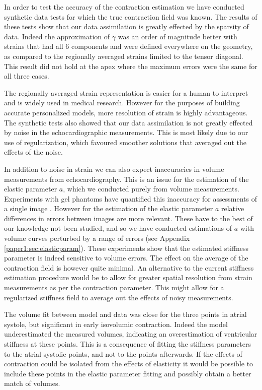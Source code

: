 In order to test the accuracy of the contraction estimation 
we have conducted synthetic data tests for which the true
contraction field was known. The results of these tests
show that our data assimilation is greatly effected by the 
sparsity of data. Indeed the approximation of $\gamma$ was an order of magnitude better with strains
that had all 6 components and were defined everywhere on the geometry, 
as compared to the regionally averaged strains limited
to the tensor diagonal. This result did not hold at the apex where
the maximum errors were the same for all three cases.

The regionally averaged strain representation is easier for a
human to interpret and is widely used in 
medical research. However for the purposes of building accurate personalized models, 
more resolution of strain is highly advantageous.
The synthetic tests also showed that our data assimilation 
is not greatly effected by noise in the echocardiographic measurements. 
This is most likely due to our use of regularization, which favoured
smoother solutions that averaged out the effects of the noise. 

In addition to noise in strain we can also expect inaccuracies in volume measurements from echocardiography.
This is an issue for the estimation of the elastic parameter $a$, which we conducted purely from volume measurements.
Experiments with gel phantoms have quantified this inaccuracy for assessments of a single image \cite{aurich2014assessment}. 
However for the estimation of the elastic parameter $a$ relative differences in errors between images are more relevant.
These have to the best of our knowledge not been studied, and so we have conducted estimations of $a$ 
with volume curves perturbed by a range of errors (see Appendix \ref{paper1:sec:elasticparam}). 
These experiments show that the estimated stiffness parameter is indeed sensitive to volume errors. The effect on
the average of the contraction field is however quite minimal. 
An alternative to the current stiffness estimation procedure would be to allow
for greater spatial resolution from strain measurements as per the contraction parameter. 
This might allow for a regularized stiffness field to average out the effects of noisy measurements.

The volume fit between model and data was close for the three points in atrial systole, but significant
in early isovolumic contraction. Indeed the model underestimated the measured volumes,
indicating an overestimation of ventricular stiffness at these points. This is a consequence of 
fitting the stiffness parameters to the atrial systolic points, and not to the points afterwards. If the effects
of contraction could be isolated from the effects of elasticity it would be possible to 
include these points in the elastic parameter fitting and possibly obtain a better match of volumes.


